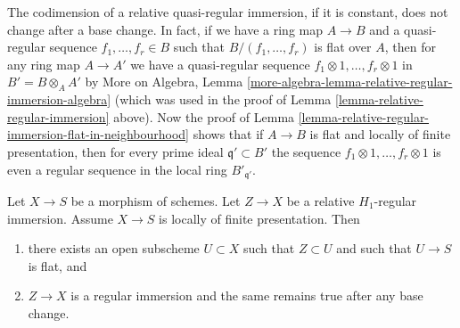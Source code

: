 \begin{remark}
\label{remark-relative-regular-immersion-elements}
The codimension of a relative quasi-regular immersion,
if it is constant, does not change after a base change.
In fact, if we have a ring map $A \to B$ and a quasi-regular
sequence $f_1, \ldots, f_r \in B$ such that $B/(f_1, \ldots, f_r)$
is flat over $A$, then for any ring map $A \to A'$
we have a quasi-regular sequence 
$f_1 \otimes 1, \ldots, f_r \otimes 1$ in $B' = B \otimes_A A'$
by More on Algebra, Lemma
\ref{more-algebra-lemma-relative-regular-immersion-algebra}
(which was used in the proof of
Lemma \ref{lemma-relative-regular-immersion} above).
Now the proof of
Lemma \ref{lemma-relative-regular-immersion-flat-in-neighbourhood}
shows that if $A \to B$ is flat and locally of finite
presentation, then for every prime ideal $\mathfrak q' \subset B'$
the sequence
$f_1 \otimes 1, \ldots, f_r \otimes 1$ is even a
regular sequence in the local ring $B'_{\mathfrak q'}$.
\end{remark}

\begin{lemma}
\label{lemma-flat-relative-H1-regular}
Let $X \to S$ be a morphism of schemes.
Let $Z \to X$ be a relative $H_1$-regular immersion.
Assume $X \to S$ is locally of finite presentation. Then
\begin{enumerate}
\item there exists an open subscheme $U \subset X$ such that
$Z \subset U$ and such that $U \to S$ is flat, and
\item $Z \to X$ is a regular immersion and the same remains
true after any base change.
\end{enumerate}
\end{lemma}

